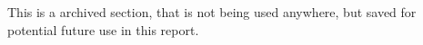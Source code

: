 This is a archived section, that is not being used anywhere, but saved for potential future use in this report.
